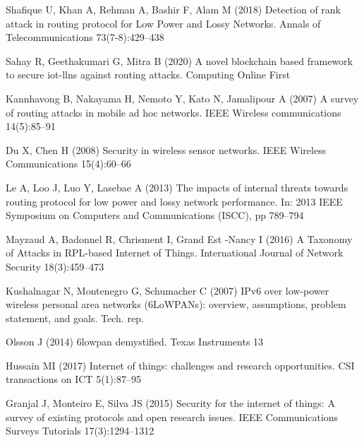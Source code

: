 \documentclass[]{svjour3}                     %
\begin{document}
\begin{thebibliography}{57}
	Shafique U, Khan A, Rehman A, Bashir F, Alam M (2018) {Detection of rank attack
		in routing protocol for Low Power and Lossy Networks}. Annals of
	Telecommunications 73(7-8):429--438
	
	Sahay R, Geethakumari G, Mitra B (2020) A novel blockchain based framework to
	secure iot-llns against routing attacks. Computing Online First
	
	Kannhavong B, Nakayama H, Nemoto Y, Kato N, Jamalipour A (2007) A survey of
	routing attacks in mobile ad hoc networks. IEEE Wireless communications
	14(5):85--91
	
	{Du} X, {Chen} H (2008) Security in wireless sensor networks. IEEE Wireless
	Communications 15(4):60--66
	
	{Le} A, {Loo} J, {Luo} Y, {Lasebae} A (2013) The impacts of internal threats
	towards routing protocol for low power and lossy network performance. In:
	2013 IEEE Symposium on Computers and Communications (ISCC), pp 789--794
	
	Mayzaud A, Badonnel R, Chrisment I, {Grand Est -Nancy} I (2016) {A Taxonomy of
		Attacks in RPL-based Internet of Things}. International Journal of Network
	Security 18(3):459--473
	
	Kushalnagar N, Montenegro G, Schumacher C (2007) {IPv6 over low-power wireless
		personal area networks (6LoWPANs): overview, assumptions, problem statement,
		and goals}. Tech. rep.
	
	Olsson J (2014) 6lowpan demystified. Texas Instruments 13
	
	Hussain MI (2017) Internet of things: challenges and research opportunities.
	CSI transactions on ICT 5(1):87--95
	
	Granjal J, Monteiro E, Silva JS (2015) Security for the internet of things: A
	survey of existing protocols and open research issues. IEEE Communications
	Surveys Tutorials 17(3):1294--1312
	

\end{thebibliography}
\end{document}
